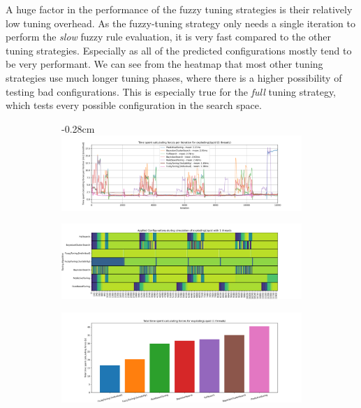 A huge factor in the performance of the fuzzy tuning strategies is their relatively low tuning overhead. As the fuzzy-tuning strategy only needs a single iteration to perform the \emph{slow} fuzzy rule evaluation, it is very fast compared to the other tuning strategies. Especially as all of the predicted configurations mostly tend to be very performant. We can see from the heatmap that most other tuning strategies use much longer tuning phases, where there is a higher possibility of testing bad configurations. This is especially true for the \emph{full} tuning strategy, which tests every possible configuration in the search space.


\begin{figure}[H]
    \centering
    \begin{subfigure}[b]{0.94\textwidth}
        \addtolength{\leftskip} {-0.28cm} %
        \includegraphics[width=\columnwidth,trim={1cm 0 2cm 0.5cm},clip]{figures/Benchmark/timing_explodingLiquid_1.png}
        \caption{}
        \label{fig:explodingLiquid1Benchmark_1thread}
    \end{subfigure}

    \begin{subfigure}[b]{\textwidth}
        \includegraphics[width=\columnwidth,trim={0.5cm 0 0cm 0.5},clip]{figures/Benchmark/heatmap_explodingLiquid_1.png}
        \caption{}
        \label{fig:explodingLiquid1Heatmap_1thread}
    \end{subfigure}

    \begin{subfigure}[c]{\textwidth}
        \includegraphics[width=\columnwidth,trim={0.5cm 0 0cm 0.5},clip]{figures/Benchmark/total_time_explodingLiquid_1.png}
        \caption{}
        \label{fig:explodingLiquid1TotalTime_1thread}
    \end{subfigure}


\end{figure}
